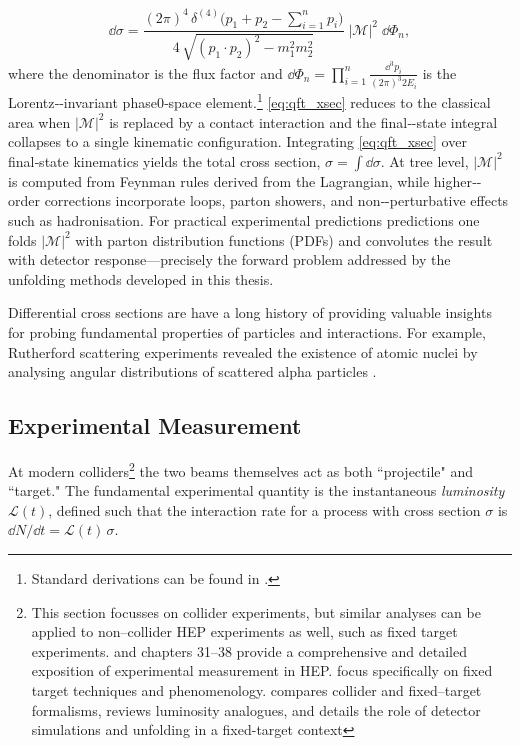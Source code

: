 \begin{definition}
    \begin{equation}
      \dd\sigma =
      \frac{(2\pi)^4 \, \delta^{(4)}\!\bigl(p_1 + p_2 - \sum_{i=1}^n p_i\bigr)}
           {4\,\sqrt{(p_1\!\cdot\!p_2)^2 - m_1^2 m_2^2}}
      \; |\mathcal{M}|^2 \;
      \dd\Phi_n,
      \label{eq:qft_xsec}
    \end{equation}
    where the denominator is the flux factor and \(\dd\Phi_n = \prod_{i=1}^{n} \tfrac{\dd^3 p_i}{(2\pi)^3 2E_i}\) is the Lorentz‑-invariant phase0‑space element.\footnote{Standard derivations can be found in \cite{peskin_introduction_1995,Navas2024ReviewPhysics, Hollik2014Quantum978-1-107-03473-0, QuantumAssessment}.
    }
    \cref{eq:qft_xsec} reduces to the classical area when \(|\mathcal{M}|^2\) is replaced by a contact interaction and the final‑-state integral collapses to a single kinematic configuration.
    Integrating \cref{eq:qft_xsec} over final‑state kinematics yields the total cross section, \(\sigma = \int \dd\sigma\).
    At tree level, \(|\mathcal{M}|^2\) is computed from Feynman rules derived from the Lagrangian, while higher‑-order corrections incorporate loops, parton showers, and non‑-perturbative effects such as hadronisation.
    For practical experimental predictions predictions one folds \(|\mathcal{M}|^2\) with parton distribution functions (PDFs) and convolutes the result with detector response---precisely the forward problem addressed by the unfolding methods developed in this thesis.

Differential cross sections are have a long history of providing valuable insights for probing fundamental properties of particles and interactions.
%
For example, Rutherford scattering experiments revealed the existence of atomic nuclei by analysing angular distributions of scattered alpha particles \cite{F.R.S.1911LXXIX.Atom}.

    \subsection{Experimental Measurement}
    \label{subsec:exp_measurement}
        At modern colliders\footnote{
            This section focusses on collider experiments, but similar analyses can be applied to non--collider HEP experiments as well, such as fixed target experiments.
            \cite{leo_techniques_1994} and \cite{particle_data_group_review_2022} chapters 31--38 provide a comprehensive and detailed exposition of experimental measurement in HEP.
            \cite{Brodsky2013PhysicsBeams, AveryCrossRates} focus specifically on fixed target techniques and phenomenology.
            \cite{MuheimNuclearLaws} compares collider and fixed--target formalisms, reviews luminosity analogues, and details the role of detector simulations and unfolding in a fixed-target context
        } the two beams themselves act as both ``projectile" and ``target." 
        The fundamental experimental quantity is the instantaneous \emph{luminosity} \(\mathcal{L}(t)\), defined such that the interaction rate for a process with cross section \(\sigma\) is \(\dd N/\dd t = \mathcal{L}(t)\,\sigma\).


\end{definition}

